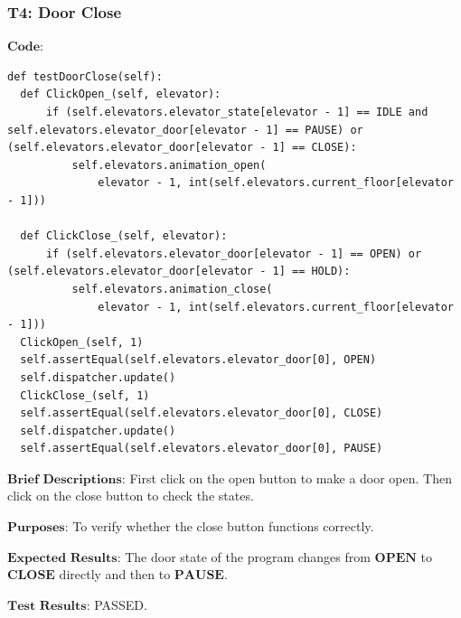 \documentclass{article}
\begin{document}
\subsubsection*{T4: Door Close}
$\textbf{Code:}$
\begin{lstlisting}
def testDoorClose(self):
  def ClickOpen_(self, elevator):
      if (self.elevators.elevator_state[elevator - 1] == IDLE and self.elevators.elevator_door[elevator - 1] == PAUSE) or (self.elevators.elevator_door[elevator - 1] == CLOSE):
          self.elevators.animation_open(
              elevator - 1, int(self.elevators.current_floor[elevator - 1]))

  def ClickClose_(self, elevator):
      if (self.elevators.elevator_door[elevator - 1] == OPEN) or (self.elevators.elevator_door[elevator - 1] == HOLD):
          self.elevators.animation_close(
              elevator - 1, int(self.elevators.current_floor[elevator - 1]))
  ClickOpen_(self, 1)
  self.assertEqual(self.elevators.elevator_door[0], OPEN)
  self.dispatcher.update()
  ClickClose_(self, 1)
  self.assertEqual(self.elevators.elevator_door[0], CLOSE)
  self.dispatcher.update()
  self.assertEqual(self.elevators.elevator_door[0], PAUSE)
\end{lstlisting}

$\textbf{Brief Descriptions:}$
First click on the open button to make a door open. Then click on the close button to check the states.

$\textbf{Purposes:}$
To verify whether the close button functions correctly.

$\textbf{Expected Results:}$
The door state of the program changes from $\textbf{OPEN}$ to $\textbf{CLOSE}$ directly and then to $\textbf{PAUSE}$.

$\textbf{Test Results:}$
PASSED.
\end{document}
